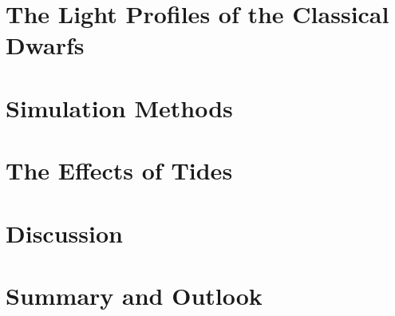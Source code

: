 \documentclass[12pt,oneside,letterpaper]{report}
\begin{document}
\chapter{The Light Profiles of the Classical Dwarfs}\label{sec:observations}


\chapter{Simulation Methods}\label{sec:methods}


\chapter{The Effects of Tides}\label{sec:results}


%

\chapter{Discussion}\label{sec:discussion}


\chapter{Summary and Outlook}\label{sec:summary}


\newpage

 



\appendix




\end{document}
